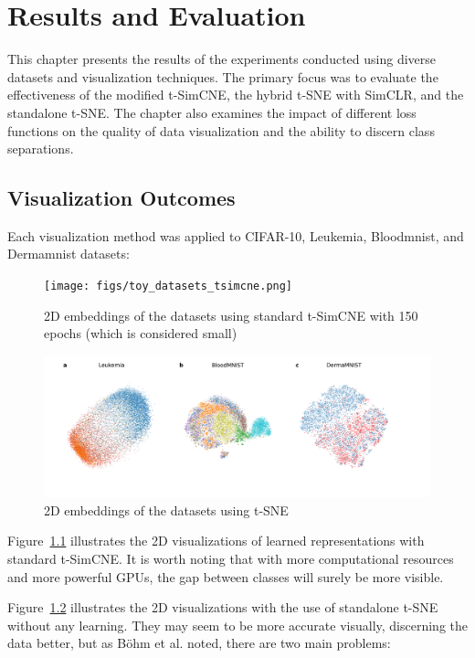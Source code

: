 \chapter{Results and Evaluation}
\label{chap:eval}

This chapter presents the results of the experiments conducted using diverse datasets and visualization techniques. The primary focus was to evaluate the effectiveness of the modified t-SimCNE, the hybrid t-SNE with SimCLR, and the standalone t-SNE. The chapter also examines the impact of different loss functions on the quality of data visualization and the ability to discern class separations.

\section{Visualization Outcomes}

Each visualization method was applied to CIFAR-10, Leukemia, Bloodmnist, and Dermamnist datasets:

\begin{figure}[hbt]
\centering
\texttt{[image: figs/toy\_datasets\_tsimcne.png]}
\caption{2D embeddings of the datasets using standard t-SimCNE with 150 epochs (which is considered small)
}
\label{fig:med_tsimcne}
\end{figure}

\begin{figure}[hbt]
\centering
\includegraphics[width=\textwidth]{figs/toy_datasets_tsne.png}
\caption{
2D embeddings of the datasets using t-SNE
}

\label{fig:med_tsne}
\end{figure}

Figure~\ref{fig:med_tsimcne} illustrates the 2D visualizations of learned representations with standard t-SimCNE. It is worth noting that with more computational resources and more powerful GPUs, the gap between classes will surely be more visible.

Figure~\ref{fig:med_tsne} illustrates the 2D visualizations with the use of standalone t-SNE without any learning. They may seem to be more accurate visually, discerning the data better, but as Böhm et al. \cite{tsimcne} noted, there are two main problems: 

